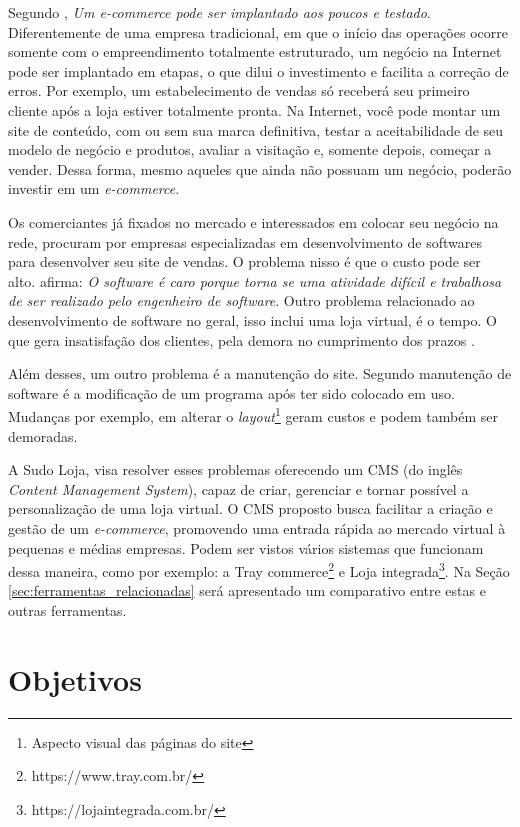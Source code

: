 \documentclass[a4paper,12pt]{monografia}
\begin{document}
Segundo , \textit{Um e-commerce pode ser implantado aos poucos e testado}. Diferentemente de uma empresa tradicional, em que o início das operações ocorre somente com o empreendimento totalmente estruturado, um negócio na Internet pode ser implantado em etapas, o que dilui o investimento e facilita a correção de erros. Por exemplo, um estabelecimento de vendas só receberá seu primeiro cliente após a loja estiver totalmente pronta. Na Internet, você pode montar um site de conteúdo, com ou sem sua marca definitiva, testar a aceitabilidade de seu modelo de negócio e produtos, avaliar a visitação e, somente depois, começar a vender. Dessa forma, mesmo aqueles que ainda não possuam um negócio, poderão investir em um \textit{e-commerce}.

Os comerciantes já fixados no mercado e interessados em colocar seu negócio na rede, procuram por empresas especializadas em desenvolvimento de softwares para desenvolver seu site de vendas. O problema nisso é que o custo pode ser alto.  afirma: \textit{O software é caro porque torna se uma atividade difícil e trabalhosa de ser realizado pelo engenheiro de software}.  Outro problema relacionado ao desenvolvimento de software no geral, isso inclui uma loja virtual, é o tempo. O que gera insatisfação dos clientes, pela demora no cumprimento dos prazos \cite{pressman}.

Além desses, um outro problema é a manutenção do site. Segundo  manutenção de software é a modificação de um programa após ter sido colocado em uso. Mudanças por exemplo, em alterar o \textit{layout}\footnote{Aspecto visual das páginas do site} geram custos e podem também ser demoradas.

A Sudo Loja, visa resolver esses problemas oferecendo um CMS (do inglês \textit{Content Management System}), capaz de criar, gerenciar e tornar possível a personalização de uma loja virtual. O CMS proposto busca facilitar a criação e gestão de um \textit{e-commerce}, promovendo uma entrada rápida ao mercado virtual à pequenas e médias empresas. Podem ser vistos vários sistemas que funcionam dessa maneira, como por exemplo: a Tray commerce\footnote{https://www.tray.com.br/} e Loja integrada\footnote{https://lojaintegrada.com.br/}. Na Seção \ref{sec:ferramentas_relacionadas} será apresentado um comparativo entre estas e outras ferramentas.



\section{Objetivos} %
\label{sec:objetivos}
\end{document}
